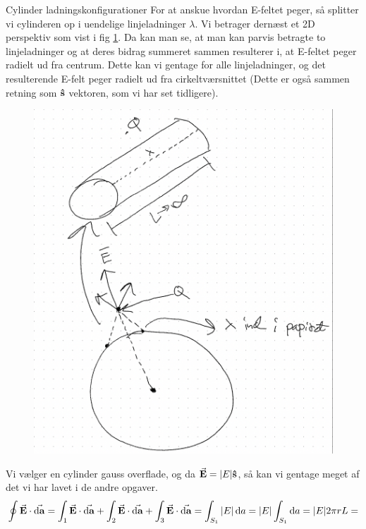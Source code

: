 \documentclass[crop=false, class=memoir]{standalone}
\begin{document}
\begin{opgave}{Cylinder ladningskonfigurationer}
    \opg
    For at anskue hvordan E-feltet peger, så splitter vi cylinderen op i uendelige linjeladninger $\lambda$. Vi betrager dernæst et 2D perspektiv som vist i fig \ref{em:opg:4.8}. Da kan man se, at man kan parvis betragte to linjeladninger og at deres bidrag summeret sammen resulterer i, at E-feltet peger radielt ud fra centrum. Dette kan vi gentage for alle linjeladninger, og det resulterende E-felt peger radielt ud fra cirkeltværsnittet (Dette er også sammen retning som $\vu{s}$ vektoren, som vi har set tidligere).
    \begin{figure}
        \centering
        \includegraphics[scale=0.4]{Elektro/Elekfig/4.8.png}
        \caption{}
        \label{em:opg:4.8}
    \end{figure}
    \opg
    Vi vælger en cylinder gauss overflade, og da $\va{E}=|E|\vu{s}$, så kan vi gentage meget af det vi har lavet i de andre opgaver.
    \begin{align*}
        \oint\va{E}\cdot\va{\dd{a}}=\int_1\va{E}\cdot\va{\dd{a}}+\int_2\va{E}\cdot\va{\dd{a}}+\int_3\va{E}\cdot\va{\dd{a}}=\int_{S_1}|E|\dd{a}=|E|\int_{S_1}\dd{a}=|E|2\pi r L=

\end{align*}
\end{opgave}
\end{document}
